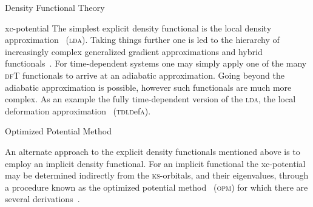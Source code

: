 \documentclass[letterpaper, 10 pt]{report}
\begin{document}
\begin{chapter}{Density Functional Theory \label{chap:dft}}
\begin{section}{xc-potential \label{sec:xcpot}}
      The simplest explicit density functional is the local density approximation~\cite{ks-eq}
      (\textsc{lda}). Taking things further one is led to the hierarchy of increasingly complex
      generalized gradient approximations and hybrid functionals~\cite{gga+}. For time-dependent systems
      one may simply apply one of the many \textsc{dfT} functionals to arrive at an adiabatic
      approximation. Going beyond the adiabatic approximation is possible, however such functionals are
      much more complex. As an example the fully time-dependent version of the \textsc{lda}, the local
      deformation approximation~\cite{TDLDefA1, TDLDefA2} (\textsc{tdld}ef\textsc{a}).

      \begin{subsection}{Optimized Potential Method \label{sec:opm}}

         An alternate approach to the explicit density functionals mentioned above is to employ an
         implicit density functional. For an implicit functional the xc-potential may be determined
         indirectly from the \textsc{ks}-orbitals, and their eigenvalues, through a procedure known as
         the optimized potential method~\cite{opm1, opm2} (\textsc{opm}) for which there are several
         derivations~\cite{opm1, opm2, opm3, opm4, opm5, opm-rev}.


\end{subsection}
\end{section}
\end{chapter}
\end{document}

